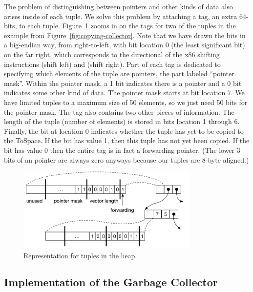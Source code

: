 \documentclass[11pt]{book}
\begin{document}
The problem of distinguishing between pointers and other kinds of data
also arises inside of each tuple. We solve this problem by attaching a
tag, an extra 64-bits, to each tuple. Figure~\ref{fig:tuple-rep} zooms
in on the tags for two of the tuples in the example from
Figure~\ref{fig:copying-collector}. Note that we have drawn the bits
in a big-endian way, from right-to-left, with bit location 0 (the
least significant bit) on the far right, which corresponds to the
directional of the x86 shifting instructions  (shift
left) and  (shift right). Part of each tag is dedicated to
specifying which elements of the tuple are pointers, the part labeled
``pointer mask''. Within the pointer mask, a 1 bit indicates there is
a pointer and a 0 bit indicates some other kind of data. The pointer
mask starts at bit location 7. We have limited tuples to a maximum
size of 50 elements, so we just need 50 bits for the pointer mask. The
tag also contains two other pieces of information. The length of the
tuple (number of elements) is stored in bits location 1 through
6. Finally, the bit at location 0 indicates whether the tuple has yet
to be copied to the ToSpace.  If the bit has value 1, then this tuple
has not yet been copied.  If the bit has value 0 then the entire tag
is in fact a forwarding pointer. (The lower 3 bits of an pointer are
always zero anyways because our tuples are 8-byte aligned.)

\begin{figure}[tbp]
\centering \includegraphics[width=0.8\textwidth]{figs/tuple-rep}
\caption{Representation for tuples in the heap.}
\label{fig:tuple-rep}
\end{figure}

\subsection{Implementation of the Garbage Collector}
\label{sec:organize-gz}
\end{document}
